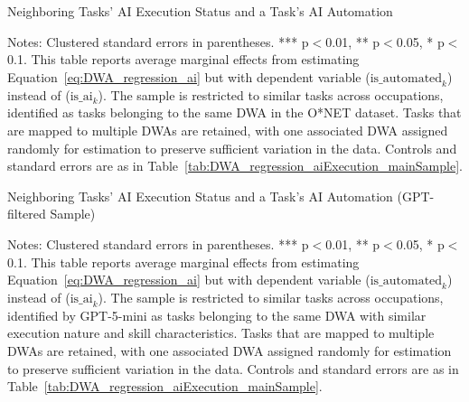 \begin{table}[!t]
\centering
\caption{Neighboring Tasks' AI Execution Status and a Task's AI Automation}
\label{tab:DWA_regression_aiAutomation_mainSample}
    \footnotesize
\resizebox{\textwidth}{!}{

}
\begin{minipage}{1\linewidth}
\begin{spacing}{0.2}
{\fontsize{9.5pt}{10pt}\selectfont Notes: Clustered standard errors in parentheses. *** p$<$0.01, ** p$<$0.05, * p$<$0.1.
This table reports average marginal effects from estimating Equation~\eqref{eq:DWA_regression_ai} but with dependent variable ($\text{is\_automated}_{k}$) instead of ($\text{is\_ai}_{k}$).
The sample is restricted to similar tasks across occupations, identified as tasks belonging to the same DWA in the O*NET dataset.
Tasks that are mapped to multiple DWAs are retained, with one associated DWA assigned randomly for estimation to preserve sufficient variation in the data.
Controls and standard errors are as in Table~\ref{tab:DWA_regression_aiExecution_mainSample}.}
\end{spacing}
\end{minipage}\end{table}

\begin{table}[!t]
\centering
\caption{Neighboring Tasks' AI Execution Status and a Task's AI Automation (GPT-filtered Sample)}
\label{tab:DWA_regression_aiAutomation_GPTsample}
    \footnotesize
\resizebox{\textwidth}{!}{

}
\begin{minipage}{1\linewidth}
\begin{spacing}{0.2}
{\fontsize{9.5pt}{10pt}\selectfont Notes: Clustered standard errors in parentheses. *** p$<$0.01, ** p$<$0.05, * p$<$0.1.
This table reports average marginal effects from estimating Equation~\eqref{eq:DWA_regression_ai} but with dependent variable ($\text{is\_automated}_{k}$) instead of ($\text{is\_ai}_{k}$).
The sample is restricted to similar tasks across occupations, identified by GPT-5-mini as tasks belonging to the same DWA with similar execution nature and skill characteristics.
Tasks that are mapped to multiple DWAs are retained, with one associated DWA assigned randomly for estimation to preserve sufficient variation in the data.
Controls and standard errors are as in Table~\ref{tab:DWA_regression_aiExecution_mainSample}.}
\end{spacing}
\end{minipage}\end{table}

